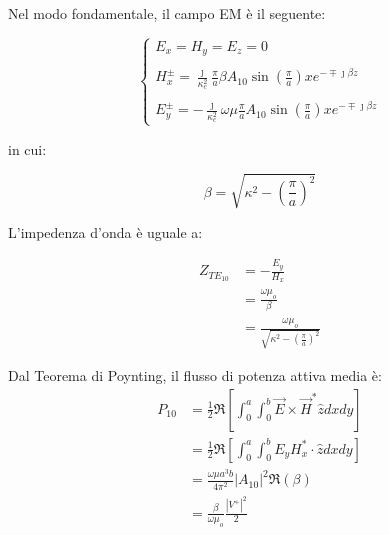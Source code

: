 Nel modo fondamentale, il campo EM è il seguente: 

{
    \Large
    \begin{equation}
        \begin{cases}
            E_x = H_y = E_z = 0 \\ \\
            H_x ^{\pm} = \frac{\jmath}{\kappa_c ^{2}} \frac{\pi}{a} \beta A_{10} \sin(\frac{\pi}{a}) x e^{-\mp \jmath \beta z} \\ \\
            E_y ^{\pm} = - \frac{\jmath}{\kappa_c ^{2}} \omega \mu \frac{\pi}{a} A_{10} \sin(\frac{\pi}{a}) x e^{-\mp \jmath \beta z} 
        \end{cases}
    \end{equation}
}

in cui: 

{
    \Large 
    \begin{equation}
        \beta = \sqrt{\kappa ^{2} - (\frac{\pi}{a})^{2}}
    \end{equation}
} 

L'impedenza d'onda è uguale a: 

{
    \Large 
    \begin{equation}
        \begin{split}
            Z_{TE_{10}} 
            &= 
            - \frac{E_y}{H_x} 
            \\ 
            &= 
            \frac{\omega \mu_o}{\beta}
            \\ 
            &= 
            \frac{\omega \mu_o}{\sqrt{\kappa ^{2} - (\frac{\pi}{a})^{2}}}
        \end{split}
    \end{equation}
} 

Dal Teorema di Poynting, il flusso di potenza attiva media è:
{
    \Large
    \begin{equation}
        \begin{split}
            P_{10} 
            &= \frac{1}{2} \Re [\int_{0}^{a} \int_{0}^{b} \vec{E} \times \vec{H} ^{*} \hat{z} dx dy]
            \\ 
            &= \frac{1}{2} \Re [\int_{0}^{a} \int_{0}^{b} E_y H_x ^{*} \cdot \hat{z} dx dy]
            \\ 
            &= \frac{\omega \mu a^{3} b}{4 \pi ^{2}} \left|A_{10}\right| ^{2} \Re(\beta) 
            \\ 
            &= 
            \frac{\beta}{\omega \mu_o} \frac{\left|V^{+}\right|^{2}}{2}
        \end{split}
    \end{equation}
}


